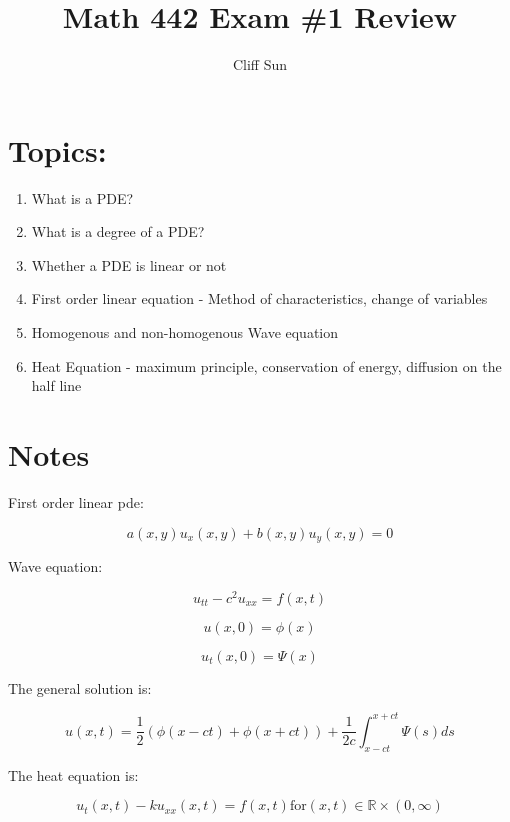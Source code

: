 \documentclass{article}
\title{Math 442 Exam \#1 Review}
\author{Cliff Sun}
\begin{document}
\maketitle
\section*{Topics:}
\begin{enumerate}
    \item What is a PDE?
    \item What is a degree of a PDE?
    \item Whether a PDE is linear or not
    \item First order linear equation - Method of characteristics, change of variables
    \item Homogenous and non-homogenous Wave equation 
    \item Heat Equation - maximum principle, conservation of energy, diffusion on the half line
\end{enumerate}

\section*{Notes}

First order linear pde:

\begin{equation}
    a(x,y)u_{x}(x,y) + b(x,y)u_{y}(x,y) = 0
\end{equation}

Wave equation:

\begin{equation}
    u_{tt} - c^2u_{xx} = f(x,t)
\end{equation}

\begin{equation}
    u(x,0) = \phi(x)
\end{equation}

\begin{equation}
    u_t(x,0) = \Psi(x)
\end{equation}

The general solution is:

\begin{equation}
    u(x,t) = \frac{1}{2}(\phi(x - ct) + \phi(x + ct)) + \frac{1}{2c}\int_{x-ct}^{x+ct}\Psi(s)ds
\end{equation}

The heat equation is:

\begin{equation}
    u_t(x,t) - ku_{xx}(x,t) = f(x,t) \textrm{for} (x,t) \in \mathbb{R} \times (0,\infty)
\end{equation}
\end{document}
